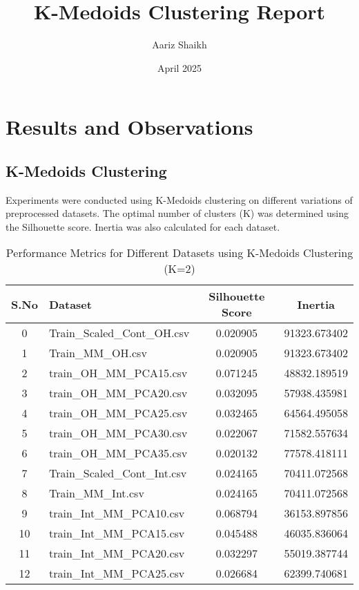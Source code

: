 \documentclass{article}
\title{K-Medoids Clustering Report}
\author{Aariz Shaikh}
\date{April 2025}
\begin{document}
\maketitle

\section{Results and Observations}

\subsection{K-Medoids Clustering}

Experiments were conducted using K-Medoids clustering on different variations of preprocessed datasets. The optimal number of clusters (K) was determined using the Silhouette score. Inertia was also calculated for each dataset.

\begin{table}[H]
\centering
\caption{Performance Metrics for Different Datasets using K-Medoids Clustering (K=2)}
\begin{tabular}{|c|l|c|c|}
\hline
\textbf{S.No} & \textbf{Dataset} & \textbf{Silhouette Score} & \textbf{Inertia} \\
\hline
0 & Train\_Scaled\_Cont\_OH.csv & 0.020905 & 91323.673402 \\
1 & Train\_MM\_OH.csv & 0.020905 & 91323.673402 \\
2 & train\_OH\_MM\_PCA15.csv & 0.071245 & 48832.189519 \\
3 & train\_OH\_MM\_PCA20.csv & 0.032095 & 57938.435981 \\
4 & train\_OH\_MM\_PCA25.csv & 0.032465 & 64564.495058 \\
5 & train\_OH\_MM\_PCA30.csv & 0.022067 & 71582.557634 \\
6 & train\_OH\_MM\_PCA35.csv & 0.020132 & 77578.418111 \\
7 & Train\_Scaled\_Cont\_Int.csv & 0.024165 & 70411.072568 \\
8 & Train\_MM\_Int.csv & 0.024165 & 70411.072568 \\
9 & train\_Int\_MM_PCA10.csv & 0.068794 & 36153.897856 \\
10 & train\_Int\_MM_PCA15.csv & 0.045488 & 46035.836064 \\
11 & train\_Int\_MM_PCA20.csv & 0.032297 & 55019.387744 \\
12 & train\_Int\_MM_PCA25.csv & 0.026684 & 62399.740681 \\
\hline
\end{tabular}
\label{tab:kmedoids_results}
\end{table}
\end{document}
